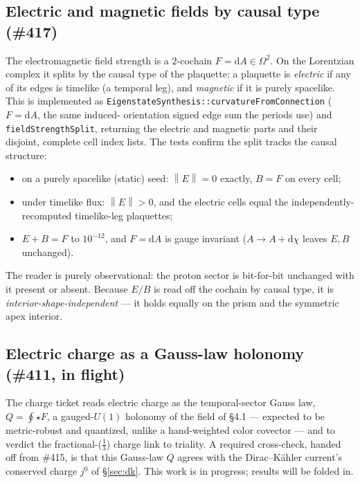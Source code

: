 \documentclass[11pt]{article}
\newcommand{\norm}[1]{\left\lVert #1 \right\rVert}
\newcommand{\dd}{\mathrm{d}}
\begin{document}
\subsection{Electric and magnetic fields by causal type (\#417)}
The electromagnetic field strength is a $2$-cochain $F=\dd A\in\Omega^2$. On the
Lorentzian complex it splits by the causal type of the plaquette: a plaquette is
\emph{electric} if any of its edges is timelike (a temporal leg), and \emph{magnetic}
if it is purely spacelike. This is implemented as
\texttt{EigenstateSynthesis::curvatureFromConnection} ($F=\dd A$, the same induced-
orientation signed edge sum the periods use) and \texttt{fieldStrengthSplit}, returning
the electric and magnetic parts and their disjoint, complete cell index lists. The tests
confirm the split tracks the causal structure:
\begin{itemize}[nosep]
  \item on a purely spacelike (static) seed: $\norm{E}=0$ exactly, $B=F$ on every cell;
  \item under timelike flux: $\norm{E}>0$, and the electric cells equal the
        independently-recomputed timelike-leg plaquettes;
  \item $E+B=F$ to $10^{-12}$, and $F=\dd A$ is gauge invariant
        ($A\to A+\dd\chi$ leaves $E,B$ unchanged).
\end{itemize}
The reader is purely observational: the proton sector is bit-for-bit unchanged with it
present or absent. Because $E/B$ is read off the cochain by causal type, it is
\emph{interior-shape-independent} --- it holds equally on the prism and the symmetric
apex interior.

\subsection{Electric charge as a Gauss-law holonomy (\#411, in flight)}
The charge ticket reads electric charge as the temporal-sector Gauss law,
$Q=\oint \star F$, a gauged-$U(1)$ holonomy of the field of \S4.1 --- expected to be
metric-robust and quantized, unlike a hand-weighted color covector --- and to verdict the
fractional-($\tfrac13$) charge link to triality. A required cross-check, handed off from
\#415, is that this Gauss-law $Q$ agrees with the Dirac--K\"ahler current's conserved
charge $j^0$ of \S\ref{sec:dk}. This work is in progress; results will be folded in.
\end{document}
